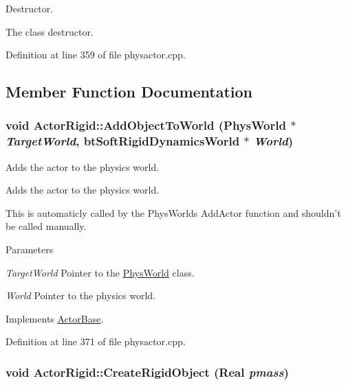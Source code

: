 Destructor. 

The class destructor. 

Definition at line 359 of file physactor.cpp.



\subsection{Member Function Documentation}
\hypertarget{classActorRigid_ac6d7e05944623329f0c2140c19e2c49e}{
\subsubsection[{AddObjectToWorld}]{\setlength{\rightskip}{0pt plus 5cm}void ActorRigid::AddObjectToWorld ({\bf PhysWorld} $\ast$ {\em TargetWorld}, \/  btSoftRigidDynamicsWorld $\ast$ {\em World})}}
\label{d5/d10/classActorRigid_ac6d7e05944623329f0c2140c19e2c49e}


Adds the actor to the physics world. 

Adds the actor to the physics world. \par
 This is automaticly called by the PhysWorlds AddActor function and shouldn't be called manually. 
\begin{DoxyParams}{Parameters}
\item[{\em TargetWorld}]Pointer to the \hyperlink{classPhysWorld}{PhysWorld} class. \item[{\em World}]Pointer to the physics world. \end{DoxyParams}


Implements \hyperlink{classActorBase_a1af82a2ed960fd114518fdf84d5ff146}{ActorBase}.



Definition at line 371 of file physactor.cpp.

\hypertarget{classActorRigid_a57d5fe315a120e97bf34e1930a7678d8}{
\subsubsection[{CreateRigidObject}]{\setlength{\rightskip}{0pt plus 5cm}void ActorRigid::CreateRigidObject (Real {\em pmass})}}
\label{d5/d10/classActorRigid_a57d5fe315a120e97bf34e1930a7678d8}


